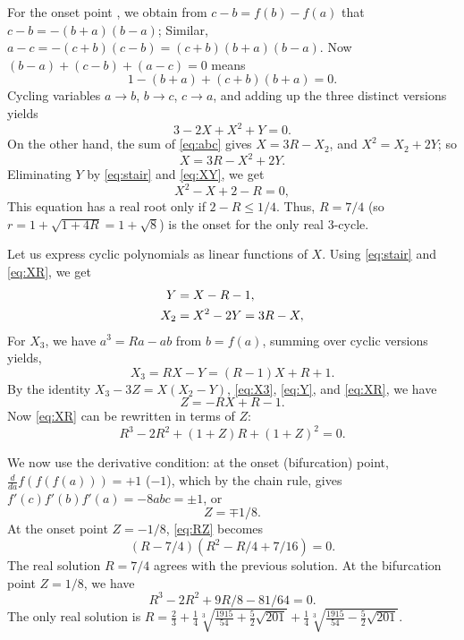 \documentclass[twocolumn,prl]{revtex4-1}
\begin{document}
For the onset point \cite{zhang},
we obtain from $c - b = f(b) - f(a)$ that
$c-b = -(b+a)(b-a)$;
Similar,
$a-c = -(c+b)(c-b)=(c+b)(b+a)(b-a)$.
Now $(b-a) + (c-b) + (a-c) = 0$ means
\[
1 - (b+a) + (c+b)(b+a) = 0.
\]
Cycling variables
$a\rightarrow b$,
$b\rightarrow c$,
$c\rightarrow a$,
and adding up the three distinct versions yields
\begin{equation}
3 - 2X + X^2 + Y = 0.
\label{eq:stair}
\end{equation}
%
On the other hand, the sum of \eqref{eq:abc} gives
$X = 3R - X_2$,
and $X^2 = X_2 + 2 Y$;
so
\begin{equation}
X = 3R - X^2 + 2Y.
\label{eq:XY}
\end{equation}
%
Eliminating $Y$ by \eqref{eq:stair} and \eqref{eq:XY}, we get
\begin{equation}
  X^2 - X + 2 - R = 0,
\label{eq:XR}
\end{equation}
This equation has a real root only if $2 - R \le 1/4$.
Thus, $R = 7/4$ (so $r = 1+\sqrt{1+4R} = 1+ \sqrt 8$)
is the onset for the only real 3-cycle.




Let us express cyclic polynomials as linear functions of $X$.
Using \eqref{eq:stair} and \eqref{eq:XR}, we get
\begin{align}
  Y    &= X - R - 1, \notag \\
  X_2  &= X^2 - 2Y = 3R-X,
\label{eq:Y}
\end{align}
%
For $X_3$,
we have $a^3 = R a - ab$ from $b = f(a)$,
summing over cyclic versions yields,
\begin{equation}
X_3 = R X - Y = (R-1) X + R + 1.
\label{eq:X3}
\end{equation}
%
By the identity
$X_3 - 3 Z = X (X_2 - Y)$,
\eqref{eq:X3}, \eqref{eq:Y}, and \eqref{eq:XR},
we have
\begin{equation}
Z = -RX + R - 1.
\label{eq:Z}
\end{equation}
Now \eqref{eq:XR} can be rewritten in terms of $Z$:
\begin{equation}
  R^3 - 2R^2 + (1+Z)R + (1+Z)^2 = 0.
\label{eq:RZ}
\end{equation}

We now use the derivative condition:
at the onset (bifurcation) point,
$\frac{d}{da}f(f(f(a))) = +1$ ($-1$),
which by the chain rule, gives
$f'(c)f'(b)f'(a) = -8abc = \pm1$, or
\begin{equation}
  Z = \mp1/8.
\label{eq:Zder}
\end{equation}
%
At the onset point $Z = -1/8$, \eqref{eq:RZ} becomes
\[
  (R-7/4) (R^2 - R/4 + 7/16) = 0.
\]
The real solution $R = 7/4$ agrees with the previous solution.
%
At the bifurcation point $Z = 1/8$, we have
\[
  R^3 - 2 R^2 + 9R/8 - 81/64 = 0.
\]
The only real solution is
$
R = \frac{2}{3}
  +\frac{1}{4} \sqrt[3]{ \frac{1915}{54} + \frac{5}{2} \sqrt{201}}
  +\frac{1}{4} \sqrt[3]{ \frac{1915}{54} - \frac{5}{2} \sqrt{201}}.
$
\end{document}
